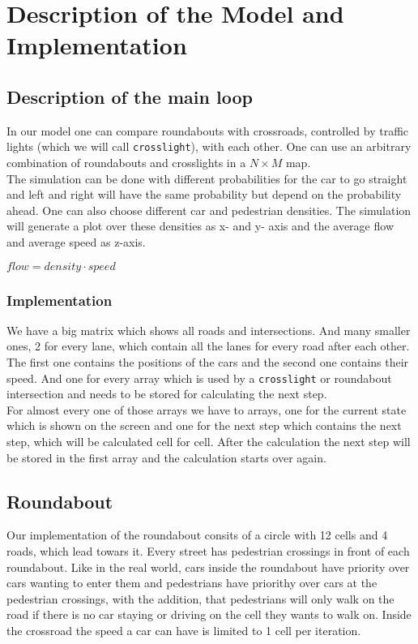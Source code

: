 \section{Description of the Model and Implementation}

\subsection{Description of the main loop}

In our model one can compare roundabouts with crossroads, controlled by traffic lights (which we will call \texttt{crosslight}), with each other. One can use an arbitrary combination of roundabouts and crosslights in a $N \times M$ map. \\
The simulation can be done with different probabilities for the car to go straight and left and right will have the same probability but depend on the probability ahead. One can also choose different car and pedestrian densities. 
The simulation will generate a plot over these densities as x- and y- axis and the average flow and average speed as z-axis. 

\begin{center} 
$flow = density \cdot speed$
\end{center}

\subsubsection{Implementation}

We have a big matrix which shows all roads and intersections. And many smaller ones, 2 for every lane, which contain all the lanes for every road after each other. 
The first one contains the positions of the cars and the second one contains their speed. And one for every array which is used by a \texttt{crosslight} or roundabout intersection and needs to be stored for calculating the next step.\\

For almost every one of those arrays we have to arrays, one for the current state which is shown on the screen and one for the next step which contains the next step, which will be calculated cell for cell. 
After the calculation the next step will be stored in the first array and the calculation starts over again.

\subsection{Roundabout}
Our implementation of the roundabout consits of a circle with 12 cells and 4 roads, which lead towars it. Every street has pedestrian crossings in front of each roundabout. 
Like in the real world, cars inside the roundabout have priority over cars wanting to enter them and pedestrians have priorithy over cars at the pedestrian crossings, 
with the addition, that pedestrians will only walk on the road if there is no car staying or driving on the cell they wants to walk on. 
Inside the crossroad the speed a car can have is limited to 1 cell per iteration. \\


